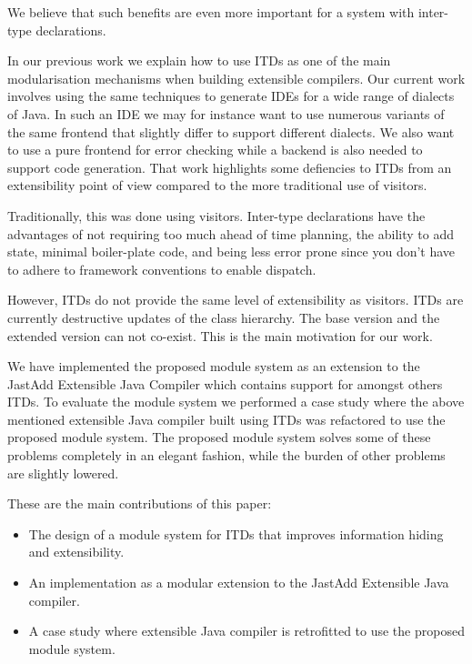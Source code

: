 We believe that such benefits are even more important for a system with
inter-type declarations. 




In our previous work we explain how to use ITDs as one of the main
modularisation mechanisms when building extensible compilers. Our current
work involves using the same techniques to generate IDEs for a wide range
of dialects of Java. In such an IDE we may for instance want to use numerous variants of the
same frontend that slightly differ to support different dialects. We also
want to use a pure frontend for error checking while a backend is also
needed to support code generation.
That work highlights some defiencies to ITDs from an extensibility point of
view compared to the more traditional use of visitors.

Traditionally, this was done using visitors. Inter-type declarations have the advantages of
not requiring too much ahead of time planning, the ability to add state, minimal boiler-plate code, 
and being less error prone since you don't have to adhere to framework conventions to enable dispatch.

However, ITDs do not provide the same level of extensibility as visitors.
ITDs are currently destructive updates of the class hierarchy. The base version and the
extended version can not co-exist. This is the main motivation for our
work. 

We have implemented the proposed module system as an extension to the
JastAdd Extensible Java Compiler which contains support for amongst others
ITDs. 
To evaluate the module system we performed a case study where the above
mentioned extensible Java compiler built using ITDs was refactored to use
the proposed module system.
The proposed module system solves some of these problems completely in an
elegant fashion, while the burden of other problems are slightly lowered.

These are the main contributions of this paper:
\begin{itemize}
\item The design of a module system for ITDs that improves information
hiding and extensibility.
\item An implementation as a modular extension to the JastAdd Extensible
Java compiler.
\item A case study where extensible Java compiler is retrofitted to use the
proposed module system.
\end{itemize}

